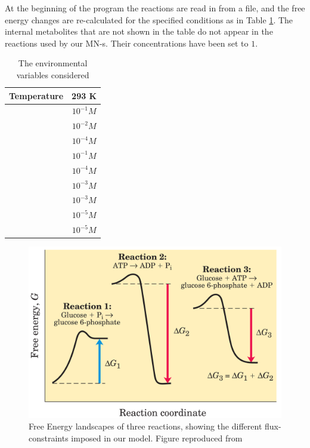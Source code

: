 \documentclass[a4paper,12pt]{article}
\begin{document}
	At the beginning of the program the reactions are read in from a file, and the free energy changes are re-calculated for the specified conditions as in Table \ref{environmentTable}. The internal metabolites that are not shown in the table do not appear in the reactions used by our MN-s. Their concentrations have been set to $1$.  
	
	\begin{table}
		\centering
	\begin{tabular}{|c|c|}
		
		\hline Temperature & 293 K \\ 
		\hline [ATP] & $10^{-1} M$ \\ 
		\hline [ADP] & $10^{-2} M$ \\ 
		\hline [AMP] & $10^{-4} M$ \\ 
		\hline [NAD$^+$] & $10^{-1} M$ \\ 
		\hline [NADH] & $10^{-4} M$ \\ 
		\hline [Pi] &  $10^{-3} M$\\ 
		\hline [PPi] & $10^{-3} M$ \\ 
		\hline [CO$_2$] & $10^{-5} M$ \\ 
		\hline [NH$_3$] & $10^{-5} M$ \\ 

		\hline 
	\end{tabular} 
	\caption{The environmental variables considered}
	\label{environmentTable}
	\end{table}


	\begin{figure}[htpb]
		\centering
		\includegraphics[width=0.6\linewidth]{freeEchangeFig.png}
		\caption{Free Energy landscapes of three reactions, showing the different flux-constraints imposed in our model. Figure reproduced from \cite{principlesofbio}}
		\label{fig:freeEchangeFig}
	\end{figure}
\end{document}
